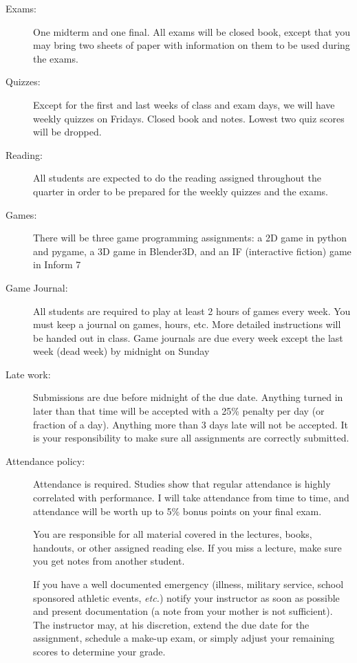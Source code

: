 \documentclass{article}
\begin{document}
\begin{description}
\item [Exams:] One midterm and one final.  All exams will be
  closed book, except that you may bring two sheets of paper with
  information on them to be used during the exams.

\item [Quizzes:] Except for the first and last weeks of class and
  exam days, we  will have weekly quizzes on Fridays.  Closed book and
  notes.  Lowest two quiz scores will be dropped.

\item [Reading:] All students are expected to do the 
  reading assigned throughout the quarter in order to be prepared for
  the weekly quizzes and the exams.

\item [Games:] There will be three game programming
  assignments:  a 2D game in python and pygame, a 3D game in Blender3D,
  and an IF (interactive fiction) game in Inform 7

\item [Game Journal:] All students are required to play at least 2
  hours of games every week.  You must keep a journal on games, hours,
  etc.  More detailed instructions will be handed out in class. Game
  journals are due every week except the last week (dead week) by
  midnight on Sunday

\item[Late work:] Submissions are due before midnight of the due
date. Anything turned in later than that time will be accepted with a
25\% penalty per day (or fraction of a day).  Anything more than 3
days late will not be accepted.  It is your responsibility to
make sure all assignments are correctly submitted.

\item[Attendance policy:]  Attendance is required.
  Studies show that regular attendance is highly correlated with
  performance.  I will take attendance from time to time,
  and attendance will be worth up to 5\% bonus points on your final
  exam.  

  You are responsible for all material covered in the lectures,
  books, handouts, or other assigned reading
  else.  If you miss a lecture, make sure you get notes from another
  student.  

  If you have a well documented emergency (illness, military service,
  school sponsored athletic events, {\em etc.}) notify your instructor
  as soon as possible and present documentation (a note from your
  mother is not sufficient).  The instructor may, at his discretion,
  extend the due date for the assignment, schedule a make-up exam,
  or simply adjust your remaining scores to determine your grade.



\end{description}
\end{document}
